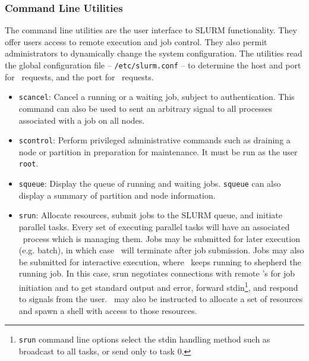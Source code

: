 \begin{itemize}

\end{itemize}

\subsubsection{Command Line Utilities}

The command line utilities are the user interface to SLURM functionality.
They offer users access to remote execution and job control. They also 
permit administrators to dynamically change the system configuration. The 
utilities read the global configuration file -- {\tt /etc/slurm.conf} --
to determine the host and port for \slurmctld\ requests, and the port
for \slurmd\ requests. 

\begin{itemize}
\item {\tt scancel}: Cancel a running or a waiting job, subject to
authentication. This command can also be used to sent an arbitrary 
signal to all processes associated with a job on all nodes.

\item {\tt scontrol}: Perform privileged administrative commands
such as draining a node or partition in preparation for maintenance. 
It must be run as the user {\tt root}.

\item {\tt squeue}: Display the queue of running and waiting jobs. 
{\tt squeue} can also display a summary of partition and node information.

\item {\tt srun}: Allocate resources, submit jobs to the SLURM queue,
and initiate parallel tasks. Every set of executing parallel tasks will
have an associated \srun\ process which is managing them. 
Jobs may be submitted for later execution (e.g. batch), in which case 
\srun\ will terminate after job submission. 
Jobs may also be submitted for interactive execution, where \srun\ keeps 
running to shepherd the running job. In this case, 
srun negotiates connections with remote \slurmd 's for job initiation and to
get standard output and error, forward stdin\footnote{{\tt srun} command
line options select the stdin handling method such as broadcast to all
tasks, or send only to task 0.}, and respond to signals from the user.
\srun\ may also be instructed to allocate a set of resources and
spawn a shell with access to those resources.

\end{itemize}

